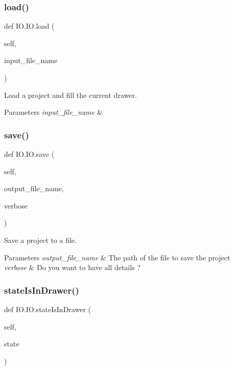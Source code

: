 \subsubsection{\texorpdfstring{load()}{load()}}
{\footnotesize\ttfamily def I\+O.\+I\+O.\+load (\begin{DoxyParamCaption}\item[{}]{self,  }\item[{}]{input\+\_\+file\+\_\+name }\end{DoxyParamCaption})}



Load a project and fill the current drawer. 


\begin{DoxyParams}{Parameters}
{\em input\+\_\+file\+\_\+name} & \\
\hline
\end{DoxyParams}
\mbox{\label{classIO_1_1IO_ab4e2498c5e6baefd2d51950edf0bc33a}} 
\subsubsection{\texorpdfstring{save()}{save()}}
{\footnotesize\ttfamily def I\+O.\+I\+O.\+save (\begin{DoxyParamCaption}\item[{}]{self,  }\item[{}]{output\+\_\+file\+\_\+name,  }\item[{}]{verbose }\end{DoxyParamCaption})}



Save a project to a file. 


\begin{DoxyParams}{Parameters}
{\em output\+\_\+file\+\_\+name} & The path of the file to save the project \\
\hline
{\em verbose} & Do you want to have all details ? \\
\hline
\end{DoxyParams}
\mbox{\label{classIO_1_1IO_a93e10f1b6d439ea1d12ea3568d84cc5b}} 
\subsubsection{\texorpdfstring{stateIsInDrawer()}{stateIsInDrawer()}}
{\footnotesize\ttfamily def I\+O.\+I\+O.\+state\+Is\+In\+Drawer (\begin{DoxyParamCaption}\item[{}]{self,  }\item[{}]{state }\end{DoxyParamCaption})}



